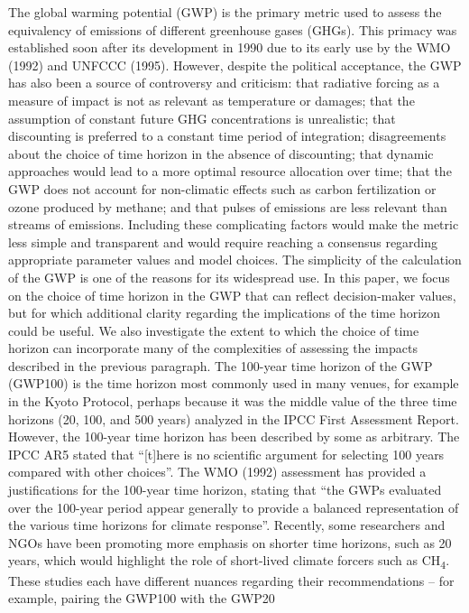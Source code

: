\documentclass[gc, manuscript]{copernicus}
\begin{document}
The global warming potential (GWP) is the primary metric used to assess
the equivalency of emissions of different greenhouse gases (GHGs). This
primacy was established soon after its development in 1990 due to its
early use by the WMO (1992) and UNFCCC (1995). However, despite the
political acceptance, the GWP has also been a source of controversy and
criticism: that radiative forcing as a measure of impact is not as
relevant as temperature or damages; that the assumption of constant
future GHG concentrations is unrealistic; that discounting is preferred
to a constant time period of integration; disagreements about the choice
of time horizon in the absence of discounting; that dynamic approaches
would lead to a more optimal resource allocation over time; that the GWP
does not account for non-climatic effects such as carbon fertilization
or ozone produced by methane; and that pulses of emissions are less
relevant than streams of emissions. Including these complicating factors
would make the metric less simple and transparent and would require
reaching a consensus regarding appropriate parameter values and model
choices. The simplicity of the calculation of the GWP is one of the
reasons for its widespread use. In this paper, we focus on the choice of
time horizon in the GWP that can reflect decision-maker values, but for
which additional clarity regarding the implications of the time horizon
could be useful. We also investigate the extent to which the choice of
time horizon can incorporate many of the complexities of assessing the
impacts described in the previous paragraph. The 100-year time horizon
of the GWP (GWP100) is the time horizon most commonly used in many
venues, for example in the Kyoto Protocol, perhaps because it was the
middle value of the three time horizons (20, 100, and 500 years)
analyzed in the IPCC First Assessment Report. However, the 100-year time
horizon has been described by some as arbitrary. The IPCC AR5 stated
that ``{[}t{]}here is no scientific argument for selecting 100 years
compared with other choices''. The WMO (1992) assessment has provided a
justifications for the 100-year time horizon, stating that ``the GWPs
evaluated over the 100-year period appear generally to provide a
balanced representation of the various time horizons for climate
response''. Recently, some researchers and NGOs have been promoting more
emphasis on shorter time horizons, such as 20 years, which would
highlight the role of short-lived climate forcers such as
CH\textsubscript{4}. These studies each have different nuances regarding
their recommendations -- for example, pairing the GWP100 with the GWP20
\end{document}
